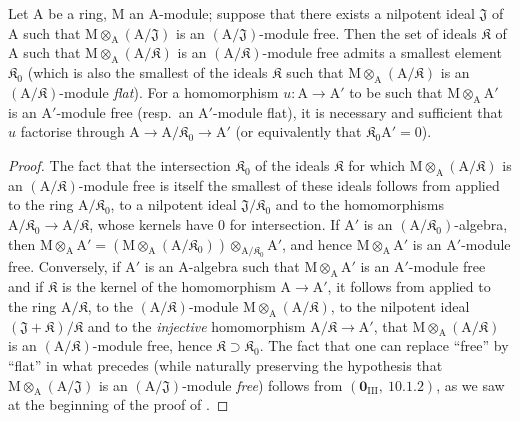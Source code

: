 \begin{corollary}[11.4.4]
\label{IV.11.4.4}
Let $\mathrm{A}$ be a ring, $\mathrm{M}$ an $\mathrm{A}$-module; suppose that there exists
a nilpotent ideal $\mathfrak{J}$ of $\mathrm{A}$ such that $\mathrm{M}\otimes_\mathrm{A}(\mathrm{A}/\mathfrak{J})$ is an $(\mathrm{A}/\mathfrak{J})$-module free. Then the set of
ideals $\mathfrak{K}$ of $\mathrm{A}$ such that $\mathrm{M}\otimes_\mathrm{A}(\mathrm{A}/\mathfrak{K})$ is an $(\mathrm{A}/\mathfrak{K})$-module free admits a smallest element $\mathfrak{K}_0$
\textup{(which is also the smallest of the ideals $\mathfrak{K}$ such that $\mathrm{M}\otimes_\mathrm{A}(\mathrm{A}/\mathfrak{K})$ is an $(\mathrm{A}/\mathfrak{K})$-module \emph{flat})}.
For a homomorphism $u:\mathrm{A}\to\mathrm{A}'$ to be such that $\mathrm{M}\otimes_\mathrm{A}\mathrm{A}'$ is an $\mathrm{A}'$-module free \textup{(resp.}\ an
$\mathrm{A}'$-module flat\textup{)}, it is necessary and sufficient that $u$ factorise through $\mathrm{A}\to\mathrm{A}/\mathfrak{K}_0\to\mathrm{A}'$ \textup{(or equivalently that $\mathfrak{K}_0\mathrm{A}'=0$)}.
\end{corollary}

\begin{proof}
The fact that the intersection $\mathfrak{K}_0$ of the ideals $\mathfrak{K}$ for which $\mathrm{M}\otimes_\mathrm{A}(\mathrm{A}/\mathfrak{K})$ is an
$(\mathrm{A}/\mathfrak{K})$-module free is itself the smallest of these ideals follows from  applied to the
ring $\mathrm{A}/\mathfrak{K}_0$, to a nilpotent ideal $\mathfrak{J}/\mathfrak{K}_0$ and to the homomorphisms $\mathrm{A}/\mathfrak{K}_0\to\mathrm{A}/\mathfrak{K}$,
whose kernels have $0$ for intersection. If $\mathrm{A}'$ is an $(\mathrm{A}/\mathfrak{K}_0)$-algebra, then
$\mathrm{M}\otimes_\mathrm{A}\mathrm{A}'=(\mathrm{M}\otimes_\mathrm{A}(\mathrm{A}/\mathfrak{K}_0))\otimes_{\mathrm{A}/\mathfrak{K}_0}\mathrm{A}'$, and hence $\mathrm{M}\otimes_\mathrm{A}\mathrm{A}'$ is an $\mathrm{A}'$-module free. Conversely, if $\mathrm{A}'$ is an $\mathrm{A}$-algebra such that $\mathrm{M}\otimes_\mathrm{A}\mathrm{A}'$ is an $\mathrm{A}'$-module free and if $\mathfrak{K}$ is the kernel
of the homomorphism $\mathrm{A}\to\mathrm{A}'$, it follows from  applied to the ring $\mathrm{A}/\mathfrak{K}$, to the
$(\mathrm{A}/\mathfrak{K})$-module $\mathrm{M}\otimes_\mathrm{A}(\mathrm{A}/\mathfrak{K})$, to the nilpotent ideal $(\mathfrak{J}+\mathfrak{K})/\mathfrak{K}$ and to the \emph{injective} homomorphism
$\mathrm{A}/\mathfrak{K}\to\mathrm{A}'$, that $\mathrm{M}\otimes_\mathrm{A}(\mathrm{A}/\mathfrak{K})$ is an $(\mathrm{A}/\mathfrak{K})$-module free, hence $\mathfrak{K}\supset\mathfrak{K}_0$. The fact that
one can replace ``free'' by ``flat'' in what precedes (while naturally preserving
the hypothesis that $\mathrm{M}\otimes_\mathrm{A}(\mathrm{A}/\mathfrak{J})$ is an $(\mathrm{A}/\mathfrak{J})$-module \emph{free}) follows from $(\mathbf{0}_{\mathrm{III}},~10.1.2)$,
as we saw at the beginning of the proof of .
\end{proof}

